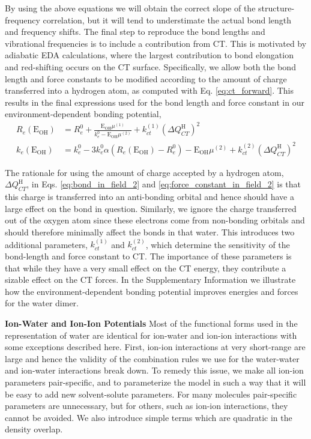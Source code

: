 \documentclass[journal=jctcce,manuscript=article]{achemso}
\begin{document}
By using the above equations we will obtain the correct slope of the structure-frequency correlation, but it will tend to understimate the actual bond length and frequency shifts. The final step to reproduce the bond lengths and vibrational frequencies is to include a contribution from CT. This is motivated by adiabatic EDA calculations, where the largest contribution to bond elongation and red-shifting occurs on the CT surface.\cite{mao2017energy} Specifically, we allow both the bond length and force constants to be modified according to the amount of charge transferred into a hydrogen atom, as computed with Eq. \ref{eq:ct_forward}. This results in the final expressions used for the bond length and force constant in our environment-dependent bonding potential,
\begin{align}
  \label{eq:bond_in_field_2}
  R_e(\mathrm{E_{OH}})&=R_e^0+ \frac{\mathrm{E_{OH}}\mu^{(1)}}{k_e^0-\mathrm{E_{OH}}\mu^{(2)}} + k_{ct}^{(1)}(\Delta Q_{CT}^{\mathrm{H}})^2 \\
  \label{eq:force_constant_in_field_2}
  k_e(\mathrm{E_{OH}})&=k_e^0-3k_e^0\alpha\left(R_e(\mathrm{E_{OH}})-R_e^0\right)-\mathrm{E_{OH}}\mu^{(2)}+k_{ct}^{(2)}(\Delta Q_{CT}^{\mathrm{H}})^2
\end{align}

The rationale for using the amount of charge accepted by a hydrogen atom, $\Delta Q_{CT}^{\mathrm{H}}$, in Eqs. \ref{eq:bond_in_field_2} and \ref{eq:force_constant_in_field_2} is that this charge is transferred into an anti-bonding orbital and hence should have a large effect on the  bond in question. Similarly, we ignore the charge transferred out of the oxygen atom since these electrons come from non-bonding orbitals and should therefore minimally affect the  bonds in that water. This introduces two additional parameters, $k_{ct}^{(1)}$ and $k_{ct}^{(2)}$, which determine the sensitivity of the bond-length and force constant to CT. The importance of these parameters is that while they have a very small effect on the CT energy, they contribute a sizable effect on the CT forces. In the Supplementary Information we illustrate how the environment-dependent bonding potential improves energies and forces for the water dimer.


\textbf{Ion-Water and Ion-Ion Potentials}
Most of the functional forms used in the representation of water are identical for ion-water and ion-ion interactions with some exceptions described here. First, ion-ion interactions at very short-range are large and hence the validity of the combination rules we use for the water-water and ion-water interactions break down. To remedy this issue, we make all ion-ion parameters pair-specific, and to parameterize the model in such a way that it will be easy to add new solvent-solute parameters. For many molecules pair-specific parameters are unnecessary, but for others, such as ion-ion interactions, they cannot be avoided. We also introduce simple terms which are quadratic in the density overlap.
\end{document}
